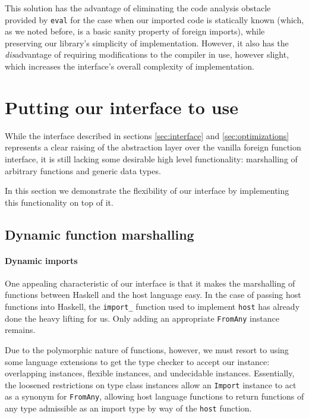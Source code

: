 \documentclass[preprint]{sigplanconf}
\begin{document}
This solution has the advantage of eliminating the code analysis obstacle
provided by \lstinline!eval! for the case when our imported code is statically
known (which, as we noted before, is a basic sanity property of foreign
imports), while preserving our library's simplicity of implementation.
However, it also has the \emph{dis}advantage of requiring modifications to the
compiler in use, however slight, which increases the interface's overall
complexity of implementation.

\section{Putting our interface to use}
\label{sec:extensions}
While the interface described in sections \ref{sec:interface} and
\ref{sec:optimizations} represents a clear raising of the abstraction layer
over the vanilla foreign function interface, it is still lacking some
desirable high level functionality: marshalling of arbitrary functions and
generic data types.

In this section we demonstrate the flexibility of our interface by implementing
this functionality on top of it.

\subsection{Dynamic function marshalling}
\label{sec:marshalling-functions}
\paragraph{Dynamic imports}
One appealing characteristic of our interface is that it makes the marshalling
of functions between Haskell and the host language easy. In the case of
passing host functions into Haskell, the \lstinline!import_! function used to
implement \lstinline!host! has already done the heavy lifting for us.
Only adding an appropriate \lstinline!FromAny! instance remains.

Due to the polymorphic nature of functions, however, we must resort to using
some language extensions to get the type checker to accept our instance:
overlapping instances, flexible instances, and undecidable instances.
Essentially, the loosened restrictions on type class instances allow an
\lstinline!Import! instance to act as a synonym for \lstinline!FromAny!,
allowing host language functions to return functions of any type admissible
as an import type by way of the \lstinline!host! function.
\end{document}

